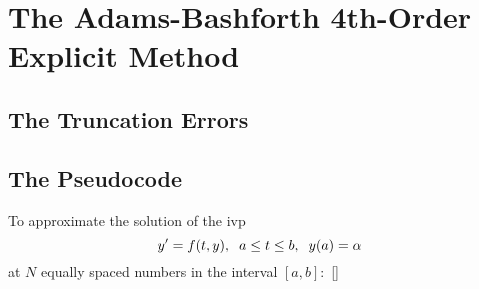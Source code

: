 \documentclass[12pt,oneside]{book}
\begin{document}
		\clearpage
	\section{The Adams-Bashforth 4th-Order Explicit Method} \label{m:ab4e}
		\begin{spacing}{1.2}
			
			
			
			\subsection*{The Truncation Errors}
			
			
			\subsection*{The Pseudocode}
				To approximate the solution of the \ac{ivp} 
				\[ y' = f(t,y), \hspace*{0.2cm} a \leq t \leq b, \hspace*{0.2cm} y(a) = \alpha \]
				at $ N $ equally spaced numbers in the interval $ [a, b]: $ []
				
			
		\end{spacing}
		
\end{document}
